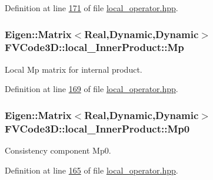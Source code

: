 Definition at line \hyperlink{local__operator_8hpp_source_l00171}{171} of file \hyperlink{local__operator_8hpp_source}{local\+\_\+operator.\+hpp}.

\subsubsection[{\texorpdfstring{Mp}{Mp}}]{\setlength{\rightskip}{0pt plus 5cm}Eigen\+::\+Matrix$<${\bf Real},Dynamic,Dynamic$>$ F\+V\+Code3\+D\+::local\+\_\+\+Inner\+Product\+::\+Mp\hspace{0.3cm}{\ttfamily [private]}}\hypertarget{classFVCode3D_1_1local__InnerProduct_a6d4624fe743827c6fa08d7977eafcb28}{}\label{classFVCode3D_1_1local__InnerProduct_a6d4624fe743827c6fa08d7977eafcb28}


Local Mp matrix for internal product. 



Definition at line \hyperlink{local__operator_8hpp_source_l00169}{169} of file \hyperlink{local__operator_8hpp_source}{local\+\_\+operator.\+hpp}.

\subsubsection[{\texorpdfstring{Mp0}{Mp0}}]{\setlength{\rightskip}{0pt plus 5cm}Eigen\+::\+Matrix$<${\bf Real},Dynamic,Dynamic$>$ F\+V\+Code3\+D\+::local\+\_\+\+Inner\+Product\+::\+Mp0\hspace{0.3cm}{\ttfamily [private]}}\hypertarget{classFVCode3D_1_1local__InnerProduct_a232fd611ad739786558956e561607ba2}{}\label{classFVCode3D_1_1local__InnerProduct_a232fd611ad739786558956e561607ba2}


Consistency component Mp0. 



Definition at line \hyperlink{local__operator_8hpp_source_l00165}{165} of file \hyperlink{local__operator_8hpp_source}{local\+\_\+operator.\+hpp}.


